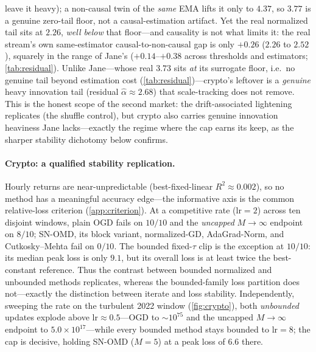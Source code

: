 \documentclass{article}
\begin{document}
leave it heavy); a non-causal twin of the \emph{same} EMA lifts it only to $4.37$, so $3.77$ is a
genuine zero-tail floor, not a causal-estimation artifact. Yet the real normalized tail sits at
$2.26$, \emph{well below} that floor---and causality is not what limits it: the real stream's own
same-estimator causal-to-non-causal gap is only $+0.26$ ($2.26$ to $2.52$), squarely in the range
of Jane's ($+0.14$--$+0.38$ across thresholds and estimators; \cref{tab:residual}). Unlike
Jane---whose real $3.73$ sits \emph{at} its surrogate floor, i.e.\ no genuine tail beyond
estimation cost (\cref{tab:residual})---crypto's leftover is a \emph{genuine} heavy innovation
tail (residual $\hat\alpha\approx2.68$) that scale-tracking does not remove. This is the honest
scope of the second market: the drift-associated lightening replicates (the shuffle control),
but crypto also carries genuine innovation heaviness Jane lacks---exactly the regime where the cap
earns its keep, as the sharper stability dichotomy below confirms.

\paragraph{Crypto: a qualified stability replication.} Hourly returns are near-unpredictable
(best-fixed-linear $R^2\approx0.002$), so no method has a meaningful accuracy edge---the
informative axis is the common relative-loss criterion (\cref{app:criterion}). At a competitive
rate ($\mathrm{lr}{=}2$) across ten disjoint windows, plain OGD fails on $10/10$ and the
\emph{uncapped} $M\!\to\!\infty$ endpoint on $8/10$; SN-OMD, its block variant,
normalized-GD, AdaGrad-Norm, and Cutkosky--Mehta fail on $0/10$. The bounded fixed-$\tau$ clip
is the exception at $10/10$: its median peak loss is only $9.1$, but its overall loss is at
least twice the best-constant reference. Thus the contrast between bounded normalized and unbounded methods replicates,
whereas the bounded-family loss partition does not---exactly the distinction between iterate
and loss stability. Independently, sweeping the rate on the turbulent 2022 window
(\cref{fig:crypto}), both
\emph{unbounded} updates explode above $\mathrm{lr}\!\approx\!0.5$---OGD to ${\sim}10^{75}$
and the uncapped $M\!\to\!\infty$ endpoint to $5.0{\times}10^{17}$---while every bounded method
stays bounded to $\mathrm{lr}{=}8$; the cap is decisive, holding SN-OMD ($M{=}5$) at a peak loss
of $6.6$ there.
\end{document}
